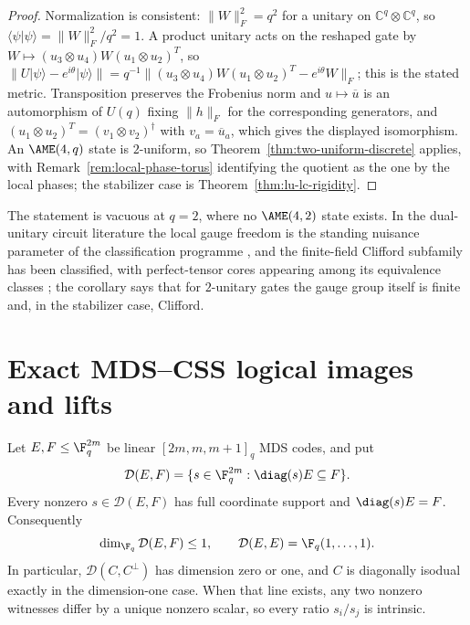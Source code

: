 \begin{proof}
Normalization is consistent: \(\lVert W\rVert_F^2=q^2\) for a unitary on
\(\mathbb C^q\otimes\mathbb C^q\), so
\(\langle\psi\vert\psi\rangle=\lVert W\rVert_F^2/q^2=1\).  A product
unitary acts on the reshaped gate by
\(W\mapsto(u_3\otimes u_4)W(u_1\otimes u_2)^{T}\), so
\(\lVert U\lvert\psi\rangle-e^{i\theta}\lvert\psi\rangle\rVert
 =q^{-1}\lVert(u_3\otimes u_4)W(u_1\otimes u_2)^T-e^{i\theta}W\rVert_F\);
this is the stated metric.  Transposition preserves the Frobenius norm and
\(u\mapsto\overline u\) is an automorphism of \(U(q)\) fixing
\(\lVert h\rVert_F\) for the corresponding generators, and
\((u_1\otimes u_2)^T=(v_1\otimes v_2)^\dagger\) with
\(v_a=\overline u_a\), which gives the displayed isomorphism.  An
\(\AME(4,q)\) state is \(2\)-uniform, so
Theorem~\ref{thm:two-uniform-discrete} applies, with
Remark~\ref{rem:local-phase-torus} identifying the quotient as the one by
the local phases; the stabilizer case is
Theorem~\ref{thm:lu-lc-rigidity}.
\end{proof}

The statement is vacuous at \(q=2\), where no \(\AME(4,2)\) state exists.
In the dual-unitary circuit literature the local gauge freedom is the
standing nuisance parameter of the classification programme
\cite{RatherAravindaLakshminarayan2022}, and the finite-field Clifford
subfamily has been classified, with perfect-tensor cores appearing among
its equivalence classes \cite{Pahari2026}; the corollary says that for
\(2\)-unitary gates the gauge group itself is finite and, in the stabilizer
case, Clifford.

\section{Exact MDS--CSS logical images and lifts}
\label{sec:exact-logical}

\begin{proposition}
\label{prop:diagonal-multiplier-line}
Let \(E,F\leq\F_q^{2m}\) be linear
\([2m,m,m+1]_q\) MDS codes, and put
\[
 \mathcal D(E,F)=
 \{s\in\F_q^{2m}:\diag(s)E\subseteq F\}.
\]
Every nonzero \(s\in\mathcal D(E,F)\) has full coordinate support and
\(\diag(s)E=F\).  Consequently
\[
 \dim_{\F_q}\mathcal D(E,F)\leq1,
 \qquad
 \mathcal D(E,E)=\F_q(1,\ldots,1).
\]
In particular, \(\mathcal D(C,C^\perp)\) has dimension zero or one,
and \(C\) is diagonally isodual exactly in the dimension-one case.
When that line exists, any two nonzero witnesses differ by a unique
nonzero scalar, so every ratio \(s_i/s_j\) is intrinsic.
\end{proposition}

